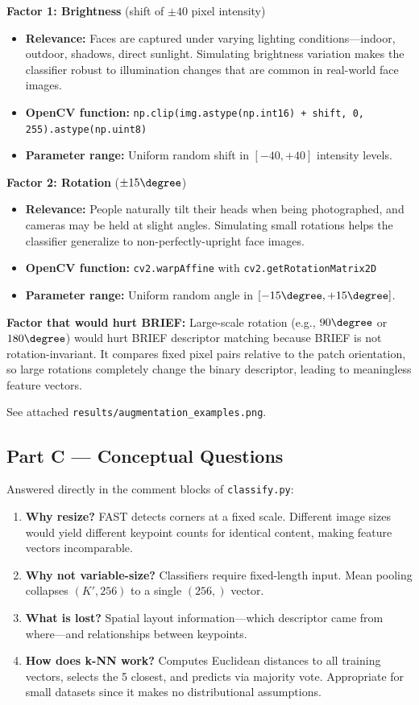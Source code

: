\documentclass[12pt]{article}
\begin{document}
\textbf{Factor 1: Brightness} (shift of $\pm 40$ pixel intensity)
\begin{itemize}
\item \textbf{Relevance:} Faces are captured under varying lighting conditions—indoor, outdoor, shadows, direct sunlight. Simulating brightness variation makes the classifier robust to illumination changes that are common in real-world face images.
\item \textbf{OpenCV function:} \texttt{np.clip(img.astype(np.int16) + shift, 0, 255).astype(np.uint8)}
\item \textbf{Parameter range:} Uniform random shift in $[-40, +40]$ intensity levels.
\end{itemize}

\textbf{Factor 2: Rotation} ($\pm 15\degree$)
\begin{itemize}
\item \textbf{Relevance:} People naturally tilt their heads when being photographed, and cameras may be held at slight angles. Simulating small rotations helps the classifier generalize to non-perfectly-upright face images.
\item \textbf{OpenCV function:} \texttt{cv2.warpAffine} with \texttt{cv2.getRotationMatrix2D}
\item \textbf{Parameter range:} Uniform random angle in $[-15\degree, +15\degree]$.
\end{itemize}

\textbf{Factor that would hurt BRIEF:} Large-scale rotation (e.g., $90\degree$ or $180\degree$) would hurt BRIEF descriptor matching because BRIEF is not rotation-invariant. It compares fixed pixel pairs relative to the patch orientation, so large rotations completely change the binary descriptor, leading to meaningless feature vectors.

See attached \texttt{results/augmentation\_examples.png}.

\subsection*{Part C --- Conceptual Questions}

Answered directly in the comment blocks of \texttt{classify.py}:

\begin{enumerate}
\item \textbf{Why resize?} FAST detects corners at a fixed scale. Different image sizes would yield different keypoint counts for identical content, making feature vectors incomparable.
\item \textbf{Why not variable-size?} Classifiers require fixed-length input. Mean pooling collapses $(K', 256)$ to a single $(256,)$ vector.
\item \textbf{What is lost?} Spatial layout information---which descriptor came from where---and relationships between keypoints.
\item \textbf{How does k-NN work?} Computes Euclidean distances to all training vectors, selects the 5 closest, and predicts via majority vote. Appropriate for small datasets since it makes no distributional assumptions.
\end{enumerate}
\end{document}
